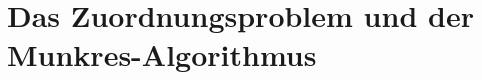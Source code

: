 %
%
%
\chapter{Das Zuordnungsproblem und der Munkres-Algorithmus\label{chapter:munkres}}
\begin{refsection}









\printbibliography[heading=subbibliography]
\end{refsection}
